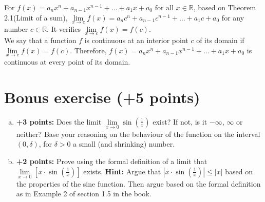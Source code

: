 \documentclass[11pt,a4paper]{article}
\begin{document}
\begin{enumerate}[(a)]
\begin{enumerate}[a)]
	For $f(x) = a_n x^n + a_{n-1} x^{n-1}+ \dots + a_1 x + a_0 \text{ for all } x \in \mathbb{R}$, based on Theorem 2.1(Limit of a sum), $\underset{x \to c}{\lim} f(x)= a_n c^n + a_{n-1} c^{n-1}+ \dots + a_1 c + a_0$ for any number $c \in \mathbb{R}$. It verifies $\underset{x \to c}{\lim} f(x)= f(c) $. \\ We say that a function $f$ is continuous at an interior point $c$ of its domain if  $\underset{x \to c}{\lim} f(x)= f(c) $. Therefore, $f(x) = a_n x^n + a_{n-1} x^{n-1}+ \dots + a_1 x + a_0 $ is continuous at every point of its domain.
\end{enumerate}

\section*{Bonus exercise (+5 points)}

\begin{enumerate}[a)]
	\item \textbf{+3 points:} Does the limit $\underset{x \to 0}{\lim} \sin (\frac{1}{x})$ exist? If not, is it $-\infty$, $\infty$ or neither? Base your reasoning on the behaviour of the function on the interval $(0,\delta)$, for $\delta >0$ a small (and shrinking) number.
	\item \textbf{+2 points:} Prove using the formal definition of a limit that $\underset{x \to 0}{\lim} [ x \cdot\sin (\frac{1}{x})]$ exists. \textbf{Hint:} Argue that $| x \cdot\sin (\frac{1}{x}) | \leq |x|$ based on the properties of the sine function. Then argue based on the formal definition as in Example 2 of section 1.5 in the book.
\end{enumerate}


\end{enumerate}
\end{document}
